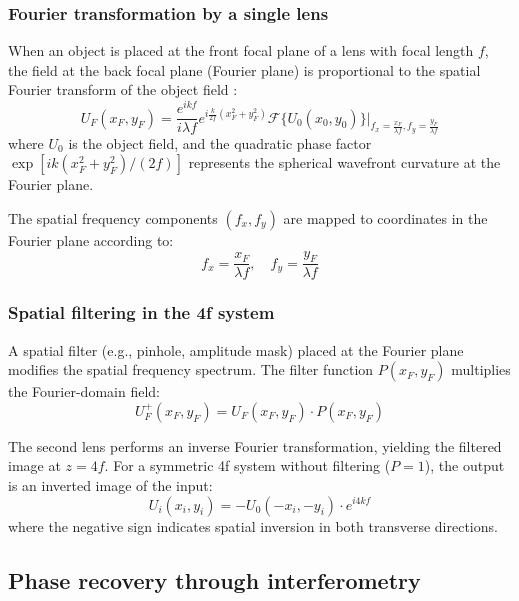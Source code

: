 \subsubsection{Fourier transformation by a single lens}

When an object is placed at the front focal plane of a lens with focal length $f$, the field at the back focal plane (Fourier plane) is proportional to the spatial Fourier transform of the object field \cite{goodman2005}:
\begin{equation}
U_F(x_F, y_F) = \frac{e^{ikf}}{i\lambda f} e^{i\frac{k}{2f}(x_F^2 + y_F^2)} \mathcal{F}\{U_0(x_0, y_0)\}\bigg|_{f_x = \frac{x_F}{\lambda f}, f_y = \frac{y_F}{\lambda f}}
\end{equation}
where $U_0$ is the object field, and the quadratic phase factor $\exp[ik(x_F^2 + y_F^2)/(2f)]$ represents the spherical wavefront curvature at the Fourier plane.

The spatial frequency components $(f_x, f_y)$ are mapped to coordinates in the Fourier plane according to:
\begin{equation}
f_x = \frac{x_F}{\lambda f}, \quad f_y = \frac{y_F}{\lambda f}
\end{equation}

\subsubsection{Spatial filtering in the 4f system}

A spatial filter (e.g., pinhole, amplitude mask) placed at the Fourier plane modifies the spatial frequency spectrum. The filter function $P(x_F, y_F)$ multiplies the Fourier-domain field:
\begin{equation}
U_F^+(x_F, y_F) = U_F(x_F, y_F) \cdot P(x_F, y_F)
\end{equation}

The second lens performs an inverse Fourier transformation, yielding the filtered image at $z = 4f$. For a symmetric 4f system without filtering ($P = 1$), the output is an inverted image of the input:
\begin{equation}
U_i(x_i, y_i) = -U_0(-x_i, -y_i) \cdot e^{i4kf}
\end{equation}
where the negative sign indicates spatial inversion in both transverse directions.

\subsection{Phase recovery through interferometry}

